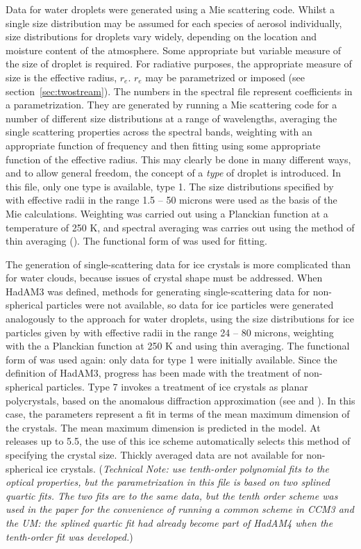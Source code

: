 \begin{enumerate}
Data for water droplets were generated using a Mie scattering code. 
Whilst a single size distribution may be assumed for each species
of aerosol individually, size distributions for droplets vary widely,
depending on the location and moisture content of the atmosphere. Some
appropriate but variable measure of the size of droplet is required.
For radiative purposes, the
appropriate measure of size is the effective radius, $r_e$. $r_e$
may be parametrized or imposed (see section~\ref{sec:twostream}). The numbers in the
spectral file represent coefficients in a parametrization. They
are generated by running a Mie scattering code for a number of different
size distributions at a range of wavelengths, averaging the single
scattering properties across the spectral bands, weighting with an
appropriate function of frequency and then fitting using some appropriate
function of the effective radius. This may clearly be done in many
different ways, and to allow general freedom, the concept of a {\em
type} of droplet is introduced. In this file, only one type is available,
type 1. The size distributions specified by 
\citet{Rockel91} with effective
radii in the range 1.5 -- 50 microns 
were used as the basis of the Mie calculations. Weighting
was carried out using a Planckian function at a temperature of 250 K,
and spectral averaging was carries out using the method of 
thin averaging (\citet{Edwards96rc}).
The functional form of \citet{Slingo82} was used for fitting. 

The generation of single-scattering data for ice crystals is more
complicated than for water clouds, because issues of crystal shape
must be addressed. When HadAM3 was defined, methods for generating 
single-scattering data for non-spherical particles were not available,
so data for ice particles were generated analogously to the approach
for water droplets, using the size distributions for ice particles 
given by \citet{Rockel91}
with effective radii in the range 24 -- 80 microns, 
weighting with the a Planckian 
function at 250 K and using thin averaging. The functional form of 
\citet{Slingo82} was used again: only data for type 1 were initially
available.
Since the definition of HadAM3, progress has been made with the treatment
of non-spherical particles. Type 7 invokes a treatment of ice  crystals
as planar polycrystals, based on the anomalous diffraction approximation
(see \citet{Kristjansson99} and \citet{Kristjansson00}). 
In this case, the
parameters represent a fit in terms of the mean maximum dimension of
the crystals. The mean maximum dimension is predicted in the model. At
releases up to 5.5, the use of this ice scheme automatically selects this
method of specifying the crystal size. Thickly averaged data are not
available for non-spherical ice crystals.
({\it Technical Note: \citet{Kristjansson00} use tenth-order polynomial
fits to the optical properties, but the parametrization
in this file is based on two
splined quartic fits. The two fits are to the same data, but the tenth
order scheme was used in the paper for the convenience of running a
common scheme in CCM3 and the UM: the splined quartic fit had already
become part of HadAM4 when the tenth-order fit was developed.}) 




\end{enumerate}
